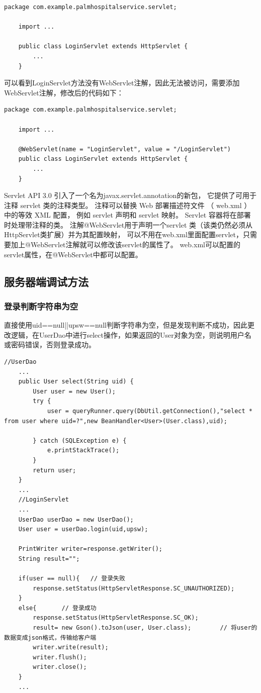 \documentclass[UTF8,12pt]{article}
\begin{document}
\begin{lstlisting}[frame=shadowbox]
    package com.example.palmhospitalservice.servlet;

    import ...   
    
    public class LoginServlet extends HttpServlet {
        ...
    }
\end{lstlisting}

可以看到LoginServlet方法没有WebServlet注解，因此无法被访问，需要添加WebServlet注解，修改后的代码如下：

\begin{lstlisting}[frame=shadowbox]
    package com.example.palmhospitalservice.servlet;

    import ...   
    
    @WebServlet(name = "LoginServlet", value = "/LoginServlet")
    public class LoginServlet extends HttpServlet {
        ...
    }
\end{lstlisting}

Servlet API 3.0 引入了一个名为javax.servlet.annotation的新包，
它提供了可用于注释 servlet 类的注释类型。
注释可以替换 Web 部署描述符文件 （ web.xml ） 中的等效 XML 配置，
例如 servlet 声明和 servlet 映射。
Servlet 容器将在部署时处理带注释的类。
注解@WebServlet用于声明一个servlet 类（该类仍然必须从HttpServlet类扩展）并为其配置映射，
可以不用在web.xml里面配置servlet，只需要加上@WebServlet注解就可以修改该servlet的属性了。
web.xml可以配置的servlet属性，在@WebServlet中都可以配置。

\subsection{服务器端调试方法}
\subsubsection{登录判断字符串为空}
直接使用uid==null||upsw==null判断字符串为空，但是发现判断不成功，因此更改逻辑，在UserDao中进行select操作，如果返回的User对象为空，则说明用户名或密码错误，否则登录成功。

\begin{lstlisting}[frame=shadowbox]
    //UserDao
    ...
    public User select(String uid) {
        User user = new User();
        try {
            user = queryRunner.query(DbUtil.getConnection(),"select * from user where uid=?",new BeanHandler<User>(User.class),uid);

        } catch (SQLException e) {
            e.printStackTrace();
        }
        return user;
    }
    ...
    //LoginServlet
    ...
    UserDao userDao = new UserDao();
    User user = userDao.login(uid,upsw);

    PrintWriter writer=response.getWriter();
    String result="";

    if(user == null){   // 登录失败
        response.setStatus(HttpServletResponse.SC_UNAUTHORIZED);
    }
    else{       // 登录成功
        response.setStatus(HttpServletResponse.SC_OK);
        result= new Gson().toJson(user, User.class);        // 将user的数据变成json格式，传输给客户端
        writer.write(result);
        writer.flush();
        writer.close();
    }
    ...    
\end{lstlisting}
\end{document}
